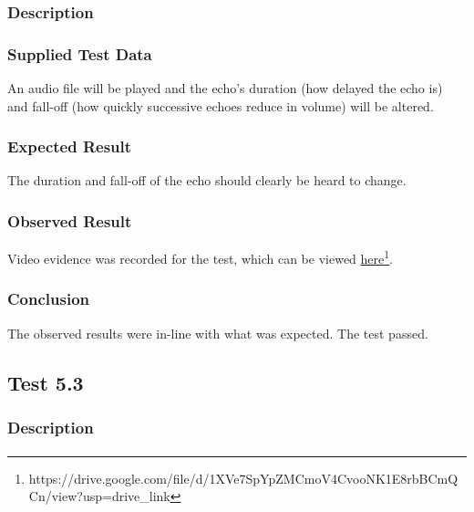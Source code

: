 \subsubsection*{Description}
\paragraph{}
{
	\centering
}

\subsubsection*{Supplied Test Data}
An audio file will be played and the echo's duration (how delayed the echo is) and fall-off (how quickly successive echoes reduce in volume) will be altered.

\subsubsection*{Expected Result}
The duration and fall-off of the echo should clearly be heard to change.

\subsubsection*{Observed Result}
\label{sec:evidence5.2}
Video evidence was recorded for the test, which can be viewed \href{https://drive.google.com/file/d/1XVe7SpYpZMCmoV4CvooNK1E8rbBCmQCn/view?usp=drive_link}{here}\footnote{
	https://drive.google.com/file/d/1XVe7SpYpZMCmoV4CvooNK1E8rbBCmQCn/view?usp=drive\_link
}.

\subsubsection*{Conclusion}
The observed results were in-line with what was expected. The test passed.


\pagebreak
\subsection{Test 5.3}
\subsubsection*{Description}
\paragraph{}
{
	\centering
}

